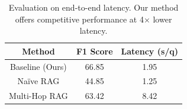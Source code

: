 \begin{table}[!htb]
\small
    \centering
    \begin{tabular}{|c|c|c|}
    \hline
        \textbf{Method} & \textbf{F1 Score} & \textbf{Latency (s/q)} \\
        \hline
        Baseline (Ours) & 66.85 & 1.95 \\
        \hline
        Na\"ive RAG & 44.85 & 1.25 \\
        Multi-Hop RAG & 63.42 & 8.42 \\
        \hline
    \end{tabular}
    \caption{Evaluation on end-to-end latency. Our method offers competitive performance at 4$\times$ lower latency.}
    \label{tab:latent}
\end{table}


